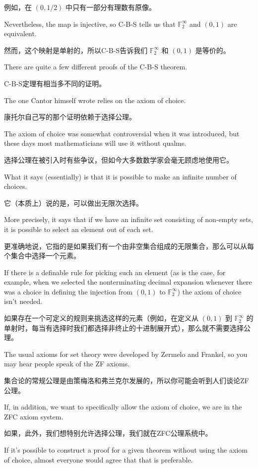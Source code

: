 例如，在 $(0, 1/2)$ 中只有一部分有理数有原像。

Nevertheless, the map is injective, so
C-B-S tells us that ${\mathbb F}_2^\infty$ and $(0, 1)$ are equivalent.

然而，这个映射是单射的，所以C-B-S告诉我们 ${\mathbb F}_2^\infty$ 和 $(0, 1)$ 是等价的。

There are quite a few different proofs of the C-B-S theorem.

C-B-S定理有相当多不同的证明。

The one
Cantor himself wrote relies on the axiom of choice.

康托尔自己写的那个证明依赖于选择公理。

The axiom of choice
was somewhat controversial when it was introduced, but these days most
mathematicians will use it without qualms.

选择公理在被引入时有些争议，但如今大多数数学家会毫无顾虑地使用它。

What it says (essentially) is that
it is possible to make an infinite number of choices.

它（本质上）说的是，可以做出无限次选择。

More precisely, it says
that if we have an infinite set consisting of non-empty sets, it is possible
to select an element out of each set.

更准确地说，它指的是如果我们有一个由非空集合组成的无限集合，那么可以从每个集合中选择一个元素。

If there is a definable rule for picking
such an element (as is the case, for example, when we selected the
nonterminating decimal expansion whenever there was a choice in defining the
injection from $(0, 1)$ to ${\mathbb F}_2^\infty$) the axiom of choice
isn't needed.

如果存在一个可定义的规则来挑选这样的元素（例如，在定义从 $(0, 1)$ 到 ${\mathbb F}_2^\infty$ 的单射时，每当有选择时我们都选择非终止的十进制展开式），那么就不需要选择公理。

The usual
axioms for set theory were developed by Zermelo and Frankel, so you may
hear people speak of the ZF axioms.

集合论的常规公理是由策梅洛和弗兰克尔发展的，所以你可能会听到人们谈论ZF公理。

If, in addition, we want to specifically
allow the axiom of choice, we are in the ZFC axiom system.

如果，此外，我们想特别允许选择公理，我们就在ZFC公理系统中。

If it's possible
to construct a proof for a given theorem without using the axiom of choice,
almost everyone would agree that that is preferable.

